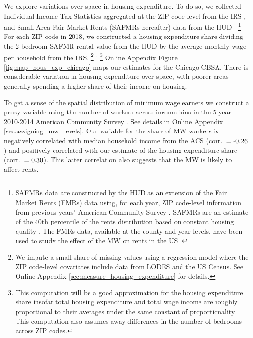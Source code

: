 
We explore variations over space in housing expenditure.
To do so, we collected Individual Income Tax Statistics aggregated at the 
ZIP code level from the IRS \parencite{IRS},
and Small Area Fair Market Rents (SAFMRs hereafter) data from the HUD 
\parencite{hudSAFMR}.%
\footnote{SAFMRs data are constructed by the HUD as an extension of the
    Fair Market Rents (FMRs) data using, for each year, ZIP code-level information
    from previous years' American Community Survey 
    \parencite[][, p.\ 35]{SafmrReport2018}.
    SAFMRs are an estimate of the 40th percentile of the rents distribution
    based on constant housing quality \parencite[][, p.\ 1]{SafmrReport2018}.
    The FMRs data, available at the county and year levels, have been used to study 
    the effect of the MW on rents in the US \parencite{Tidemann2018, Yamagishi2019}.}
For each ZIP code in 2018, we constructed a housing expenditure share dividing 
the 2 bedroom SAFMR rental value from the HUD by the average monthly wage per 
household from the IRS.%
\footnote{We impute a small share of missing values using a regression model 
	where the ZIP code-level covariates include data from LODES and the US 
	Census.
	See Online Appendix \ref{sec:measure_housing_expenditure} for details.}%
\textsuperscript{,}%
\footnote{This computation will be a good approximation for the housing 
	expenditure share insofar total housing expenditure and total wage income 
	are roughly proportional to their averages under the same constant of 
	proportionality.
	This computation also assumes away differences in the number of bedrooms 
	across ZIP codes.}
Online Appendix Figure \ref{fig:map_hous_exp_chicago} maps our estimates for the 
Chicago CBSA.
There is considerable variation in housing expenditure over space, with poorer
areas generally spending a higher share of their income on housing.

To get a sense of the spatial distribution of minimum wage earners we construct 
a proxy variable using the number of workers across income bins in the 5-year 
2010-2014 American Community Survey \parencite[ACS;][]{CensusACS}.
See details in Online Appendix \ref{sec:assigning_mw_levels}.
Our variable for the share of MW workers is negatively correlated with median 
household income from the ACS (corr.\ $=\textnormal{-0.26}$) and 
positively correlated with our estimate of the housing expenditure share 
(corr.\ $=\textnormal{0.30}$).
This latter correlation also suggests that the MW is likely to affect rents.

